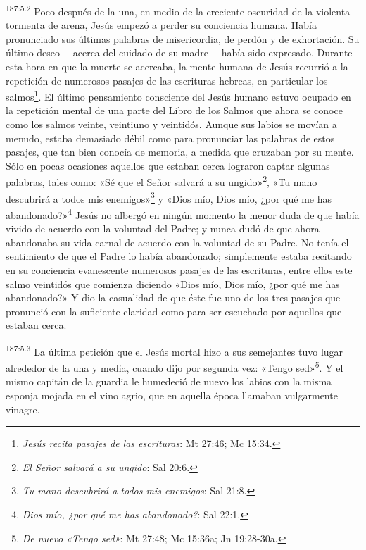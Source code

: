 \par 
\textsuperscript{187:5.2} Poco después de la una, en medio de la creciente oscuridad de la violenta tormenta de arena, Jesús empezó a perder su conciencia humana. Había pronunciado sus últimas palabras de misericordia, de perdón y de exhortación. Su último deseo ---acerca del cuidado de su madre--- había sido expresado. Durante esta hora en que la muerte se acercaba, la mente humana de Jesús recurrió a la repetición de numerosos pasajes de las escrituras hebreas, en particular los salmos\footnote{\textit{Jesús recita pasajes de las escrituras}: Mt 27:46; Mc 15:34.}. El último pensamiento consciente del Jesús humano estuvo ocupado en la repetición mental de una parte del Libro de los Salmos que ahora se conoce como los salmos veinte, veintiuno y veintidós. Aunque sus labios se movían a menudo, estaba demasiado débil como para pronunciar las palabras de estos pasajes, que tan bien conocía de memoria, a medida que cruzaban por su mente. Sólo en pocas ocasiones aquellos que estaban cerca lograron captar algunas palabras, tales como: «Sé que el Señor salvará a su ungido»\footnote{\textit{El Señor salvará a su ungido}: Sal 20:6.}, «Tu mano descubrirá a todos mis enemigos»\footnote{\textit{Tu mano descubrirá a todos mis enemigos}: Sal 21:8.} y «Dios mío, Dios mío, ¿por qué me has abandonado?»\footnote{\textit{Dios mío, ¿por qué me has abandonado?}: Sal 22:1.} Jesús no albergó en ningún momento la menor duda de que había vivido de acuerdo con la voluntad del Padre; y nunca dudó de que ahora abandonaba su vida carnal de acuerdo con la voluntad de su Padre. No tenía el sentimiento de que el Padre lo había abandonado; simplemente estaba recitando en su conciencia evanescente numerosos pasajes de las escrituras, entre ellos este salmo veintidós que comienza diciendo «Dios mío, Dios mío, ¿por qué me has abandonado?» Y dio la casualidad de que éste fue uno de los tres pasajes que pronunció con la suficiente claridad como para ser escuchado por aquellos que estaban cerca.

\par 
\textsuperscript{187:5.3} La última petición que el Jesús mortal hizo a sus semejantes tuvo lugar alrededor de la una y media, cuando dijo por segunda vez: «Tengo sed»\footnote{\textit{De nuevo «Tengo sed»}: Mt 27:48; Mc 15:36a; Jn 19:28-30a.}. Y el mismo capitán de la guardia le humedeció de nuevo los labios con la misma esponja mojada en el vino agrio, que en aquella época llamaban vulgarmente vinagre.

